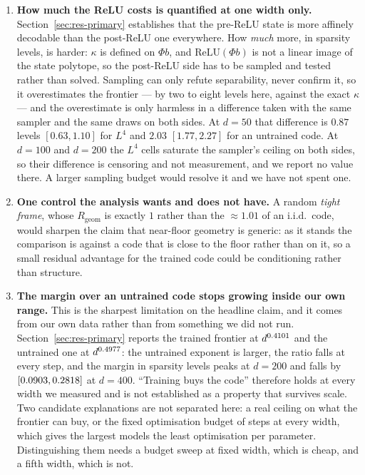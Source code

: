 \documentclass[preprint,12pt]{elsarticle}
\theoremstyle{definition}
\begin{document}
\begin{enumerate}[leftmargin=*,itemsep=1pt]
\item \textbf{How much the ReLU costs is quantified at one width only.} Section~\ref{sec:res-primary}
establishes that the pre-ReLU state is more affinely decodable than the post-ReLU one everywhere. How
\emph{much} more, in sparsity levels, is harder: $\kappa$ is defined on $\Phi b$, and
$\mathrm{ReLU}(\Phi b)$ is not a linear image of the state polytope, so the post-ReLU side has to be
sampled and tested rather than solved. Sampling can only refute separability, never confirm it, so it
overestimates the frontier --- by two to eight levels here, against the exact $\kappa$ --- and the
overestimate is only harmless in a difference taken with the same sampler and the same draws on both
sides. At $d=50$ that difference is $0.87$ levels $[0.63,1.10]$ for $L^4$ and $2.03$ $[1.77,2.27]$ for
an untrained code. At $d=100$ and $d=200$ the $L^4$ cells saturate the sampler's ceiling on both
sides, so their difference is censoring and not measurement, and we report no value there. A larger
sampling budget would resolve it and we have not spent one.

\item \textbf{One control the analysis wants and does not have.} A random \emph{tight frame}, whose
$R_{\mathrm{geom}}$ is exactly $1$ rather than the $\approx1.01$ of an i.i.d.\ code, would sharpen
the claim that near-floor geometry is generic: as it stands the comparison is against a code that
is close to the floor rather than on it, so a small residual advantage for the trained code could be
conditioning rather than structure.

\item \textbf{The margin over an untrained code stops growing inside our own range.} This is the
sharpest limitation on the headline claim, and it comes from our own data rather than from something
we did not run. Section~\ref{sec:res-primary} reports the trained frontier at $d^{0.4101}$ and
the untrained one at $d^{0.4977}$: the untrained exponent is larger, the ratio falls at every
step, and the margin in sparsity levels peaks at $d=200$ and falls by \MarginDrop{}
$[0.0903,0.2818]$ at $d=400$. ``Training buys the code'' therefore holds at every
width we measured and is not established as a property that survives scale. Two candidate
explanations are not separated here: a real ceiling on what the frontier can buy, or the fixed
optimisation budget of \EsevenSteps{} steps at every width, which gives the largest models the least
optimisation per parameter. Distinguishing them needs a budget sweep at fixed width, which is cheap,
and a fifth width, which is not.
\end{enumerate}
\end{document}
